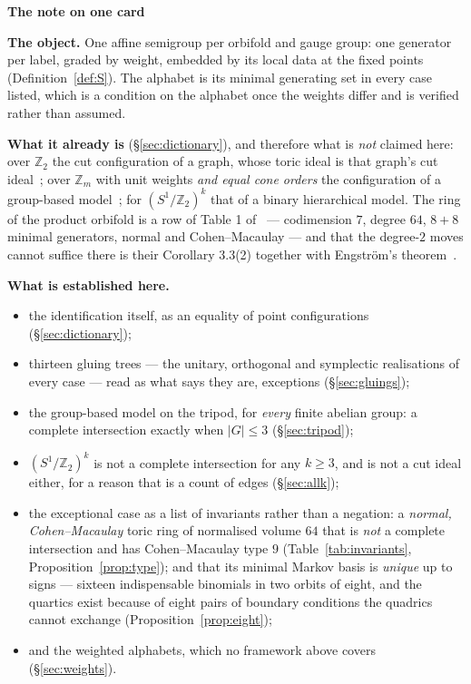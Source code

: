 \documentclass[11pt,a4paper]{article}
\theoremstyle{definition}
\newcommand{\ZZ}{\mathbb{Z}}
\newenvironment{ficha}[1]{%
  \par\medskip\begin{lrbox}{\fichabox}\begin{minipage}{0.93\textwidth}%
  {\normalsize\bfseries\color{hdrblue}#1}\par\medskip\small%
}{%
  \end{minipage}\end{lrbox}%
  \begin{center}\setlength{\fboxsep}{9pt}%
  \fcolorbox{hdrblue}{softgrey}{\usebox{\fichabox}}\end{center}\par\medskip%
}
\begin{document}
\begin{ficha}{The note on one card}
\noindent
\textbf{The object.} One affine semigroup per orbifold and gauge group: one generator per label,
graded by weight, embedded by its local data at the fixed points (Definition~\ref{def:S}). The
alphabet is its minimal generating set in every case listed, which is a condition on the alphabet
once the weights differ and is verified rather than assumed.

\smallskip\noindent
\textbf{What it already is} (\S\ref{sec:dictionary}), and therefore what is \emph{not} claimed here:
over $\ZZ_2$ the cut configuration of a graph, whose toric
ideal is that graph's cut ideal~\cite{SScuts}; over $\ZZ_m$ with unit weights \emph{and equal cone
orders} the configuration of a group-based model~\cite{SSphylo}; for $(S^1/\ZZ_2)^k$ that of a
binary hierarchical model. The ring of the product orbifold is a row of Table 1
of~\cite{SScuts} --- codimension $7$, degree $64$, $8+8$ minimal generators, normal and
Cohen--Macaulay --- and that the degree-$2$ moves cannot suffice there is their Corollary 3.3(2)
together with Engstr\"om's theorem~\cite{Engstrom}.

\smallskip\noindent
\textbf{What is established here.}
\begin{itemize}\itemsep1pt \parskip0pt 
\item the identification itself, as an equality of point configurations (\S\ref{sec:dictionary});
\item thirteen gluing trees --- the unitary, orthogonal and symplectic realisations of every case ---
read as what \cite{SSphylo} says they are, exceptions (\S\ref{sec:gluings});
\item the group-based model on the tripod, for \emph{every} finite abelian group: a complete
intersection exactly when $|G|\le3$ (\S\ref{sec:tripod});
\item $(S^1/\ZZ_2)^k$ is not a complete intersection for any $k\ge3$, and is not a cut ideal either,
for a reason that is a count of edges (\S\ref{sec:allk});
\item the exceptional case as a list of invariants rather than a negation: a \emph{normal,
Cohen--Macaulay} toric ring of normalised volume $64$ that is \emph{not} a complete
intersection and has Cohen--Macaulay type $9$ (Table~\ref{tab:invariants},
Proposition~\ref{prop:type}); and that its minimal Markov basis is \emph{unique} up to
signs --- sixteen indispensable binomials in two orbits of eight, and the quartics exist
because of eight pairs of boundary conditions the quadrics cannot exchange
(Proposition~\ref{prop:eight});
\item and the weighted alphabets, which no framework above covers (\S\ref{sec:weights}).
\end{itemize}


\end{ficha}
\end{document}
